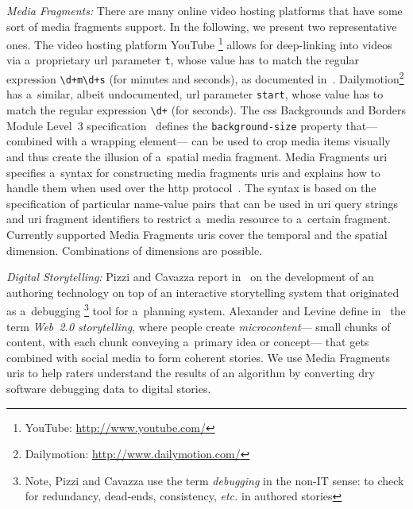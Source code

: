 \documentclass{article}
\begin{document}
\noindent \textit{Media Fragments:}
There are many online video hosting platforms
that have some sort of media fragments support.
In the following, we present two representative ones.
The video hosting platform YouTube%
\footnote{YouTube: \url{http://www.youtube.com/}}
allows for deep-linking into videos
via a~proprietary {\sc url} parameter \texttt{t},
whose value has to match the regular expression
\texttt{\textbackslash d+m\textbackslash d+s} (for minutes and seconds),
as documented in~\cite{youtube2008link}.
Dailymotion\footnote{Dailymotion: \url{http://www.dailymotion.com/}}
has a~similar, albeit undocumented, {\sc url} parameter \texttt{start},
whose value has to match the regular expression
\texttt{\textbackslash d+} (for seconds).
The {\sc css} Backgrounds and Borders Module Level~3 specification~\cite{bos2012css3}
defines the \texttt{background-size} property
that---combined with a wrapping element---%
can be used to crop media items visually
and thus create the illusion of a~spatial media fragment.
Media Fragments {\sc uri}~\cite{troncy2012mediafragments} specifies
a~syntax for constructing media fragments {\sc uri}s
and explains how to handle them
when used over the {\sc http} protocol~\cite{fielding1999http}.
The syntax is based on the specification of particular name-value pairs
that can be used in {\sc uri} query strings and {\sc uri} fragment identifiers
to restrict a~media resource to a~certain fragment.
Currently supported Media Fragments {\sc uri}s %
cover the temporal and the spatial dimension.
Combinations of dimensions are possible.

\noindent \textit{Digital Storytelling:}
Pizzi and Cavazza report in~\cite{pizzi2008debugging} on the development of
an authoring technology on top of an interactive storytelling system
that originated as a~debugging%
\footnote{Note, Pizzi and Cavazza use the term \emph{debugging} in the non-IT sense:
to check for redundancy, dead-ends, consistency, \emph{etc.} in authored stories}
tool for a~planning system.
Alexander and Levine define in~\cite{alexander2008storytelling}
the term \emph{Web~2.0 storytelling}, where people create \emph{microcontent}---%
small chunks of content, with each chunk conveying a~primary idea or concept---%
that gets combined with social media to form coherent stories.
We use Media Fragments {\sc uri}s to help raters understand
the results of an algorithm by converting dry software debugging data
to digital stories.
\end{document}
